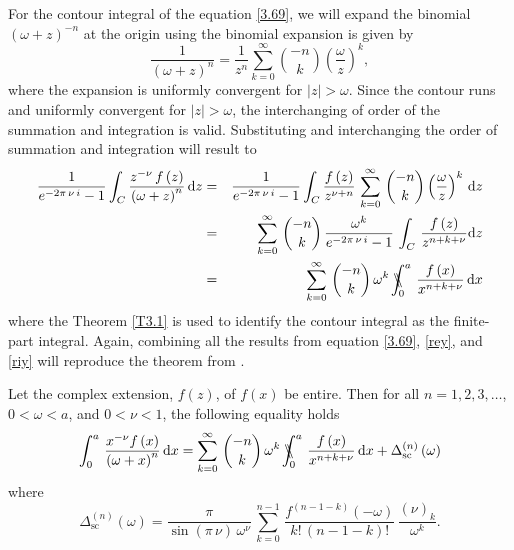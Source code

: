 For the contour integral of the equation \eqref{3.69}, we will expand the binomial $(\omega + z)^{-n}$ at the origin using the binomial expansion is given by
\begin{equation}
		\frac{1}{\left(\omega+z\right)^{n}}=\frac{1}{z^n}\sum_{k=0}^{\infty}{{-n}\choose k}\left(\frac{\omega}{z}\right)^{k},
\end{equation}
where the expansion is uniformly convergent for $|z| > \omega$. Since the contour runs and uniformly convergent for $|z| > \omega$, the interchanging of order of the summation and integration is valid. Substituting and interchanging the order of summation and integration will result to 
\begin{eqnarray}\nonumber\label{riy}
	\frac{1}{e^{-2\pi\,\nu\,i}-1}\int_{C}\frac{z^{-\nu}\,f\left(z\right)}{\left(\omega+z\right)^{n}}\,\mathrm{d}z&=&\frac{1}{e^{-2\pi\,\nu\,i}-1}\int_{C}\frac{f\left(z\right)}{z^{\nu+n}}\,\sum_{k=0}^{\infty}\,{{-n}\choose{k}}\left(\frac{\omega}{z}\right)^{k}\,\mathrm{d}z\\\nonumber
	&=&\sum_{k=0}^{\infty}\,{{-n}\choose{k}}\,\frac{\omega^{k}}{e^{-2\pi\,\nu\,i}-1}\,\int_{C}\,\frac{f\left(z\right)}{z^{n+k+\nu}}\mathrm{d}z\\
	&=&\sum_{k=0}^{\infty}\,{{-n}\choose{k}}\,\omega^{k}\,\bbint{0}{a}\,\frac{f\left(x\right)}{x^{n+k+\nu}}\,\mathrm{d}x
\end{eqnarray}
where the Theorem \ref{T3.1} is used to identify the contour integral as the finite-part integral. Again, combining all the results from equation \eqref{3.69}, \eqref{rey}, and \eqref{riy} will reproduce the theorem from  \cite{tica2018finite}.

\begin{theorem}\label{T3.4}
	Let the complex extension, $f\left(z\right)$, of $f\left(x\right)$ be entire. Then for all $n=1,2,3,\dots$, $0<\omega<a$, and $0<\nu<1$, the following equality holds
	\begin{equation} \label{3.64}
	\int_{0}^{a}\,\frac{x^{-\nu}f\left(x\right)}{\left(\omega+x\right)^{n}}\,\mathrm{d}x=\sum_{k=0}^{\infty}\,{{-n}\choose{k}}\,\omega^{k}\,\bbint{0}{a}\,\frac{f\left(x\right)}{x^{n+k+\nu}}\,\mathrm{d}x+\Delta_{\mathrm{sc}}^{(n)}\left(\omega\right)
	\end{equation}
	where
	\begin{equation} \label{3.65}
	\Delta_{\mathrm{sc}}^{(n)}\left(\omega\right)=\frac{\pi}{\sin\left(\pi\,\nu\right)\,\omega^{\nu}}\,\sum_{k=0}^{n-1}\,\frac{f^{(n-1-k)}\left(-\omega\right)}{k!\,\left(n-1-k\right)!}\,\frac{\left(\nu\right)_{k}}{\omega^{k}} .
	\end{equation}
\end{theorem}

